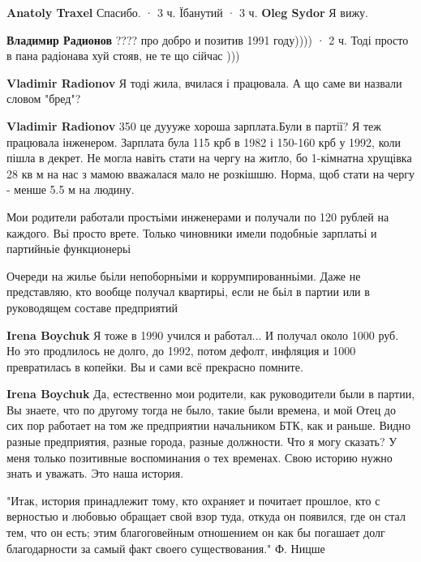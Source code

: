 \begin{itemize}
\begin{itemize}
\textbf{Anatoly Traxel} Спасибо.
 · 3 ч.
Їбанутий
 · 3 ч.
\textbf{Oleg Sydor} Я вижу.

\textbf{Владимир Радионов} ???? про добро и позитив 1991 году))))
 · 2 ч.
Тоді просто в пана радіонава хуй стояв, не те що сійчас )))

\textbf{Vladimir Radionov} Я тоді жила, вчилася і працювала. А що саме ви назвали словом "бред"?

\textbf{Vladimir Radionov} 350 це дуууже хороша зарплата.Були в партії? Я теж працювала інженером. Зарплата була 115 крб в 1982 і 150-160 крб у 1992, коли пішла в декрет. Не могла навіть стати на чергу на житло, бо 1-кімнатна хрущівка 28 кв м на нас з мамою вважалася мало не розкішшю. Норма, щоб стати на чергу - менше 5.5 м на людину.

Мои родители работали простьіми инженерами и получали по 120 рублей на каждого. Вьі просто врете. Только чиновники имели подобньіе зарплатьі и партийньіе функционерьі

Очереди на жилье бьіли непоборньіми и коррумпированньіми. Даже не представляю, кто вообще получал квартирьі, если не бьіл в партии или в руководящем составе предприятий

\textbf{Irena Boychuk} Я тоже в 1990 учился и работал... И получал около 1000 руб. Но это продлилось не долго, до 1992, потом дефолт, инфляция и 1000 превратилась в копейки. Вы и сами всё прекрасно помните.


\textbf{Irena Boychuk} Да, естественно мои родители, как руководители были в
партии, Вы знаете, что по другому тогда не было, такие были времена, и мой Отец
до сих пор работает на том же предприятии начальником БТК, как и раньше. Видно
разные предприятия, разные города, разные должности. Что я могу сказать? У меня
только позитивные воспоминания о тех временах. Свою историю нужно знать и
уважать. Это наша история.



"Итак, история принадлежит тому, кто охраняет и почитает прошлое, кто с
верностью и любовью обращает свой взор туда, откуда он появился, где он стал
тем, что он есть; этим благоговейным отношением он как бы погашает долг
благодарности за самый факт своего существования." Ф. Ницше


\end{itemize}
\end{itemize}
